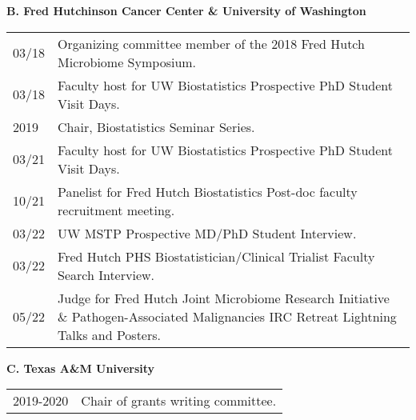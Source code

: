 \documentclass[10pt]{article}
\begin{document}
\textbf{B. Fred Hutchinson Cancer Center \& University of Washington}
\begin{table}[H]
\hskip0.9cm\begin{tabular}{p{1.6cm}p{12cm}}
03/18 & Organizing committee member of the 2018 Fred Hutch Microbiome Symposium.\\
03/18 & Faculty host for UW Biostatistics Prospective PhD Student Visit Days.\\
2019 & Chair, Biostatistics Seminar Series.\\
03/21 & Faculty host for UW Biostatistics Prospective PhD Student Visit Days. \\
10/21 & Panelist for Fred Hutch Biostatistics Post-doc faculty recruitment meeting.\\
03/22 & UW MSTP Prospective MD/PhD Student Interview.\\
03/22 & Fred Hutch PHS Biostatistician/Clinical Trialist Faculty Search Interview. \\
05/22 & Judge for Fred Hutch Joint Microbiome Research Initiative \& Pathogen-Associated Malignancies IRC Retreat Lightning Talks and Posters.
\end{tabular}
\end{table}


\textbf{C. Texas A\&M University }
\begin{table}[H]
\hskip0.9cm\begin{tabular}{p{1.6cm}p{12cm}}
2019-2020 & Chair of grants writing committee.
\end{tabular}
\end{table}
\end{document}
